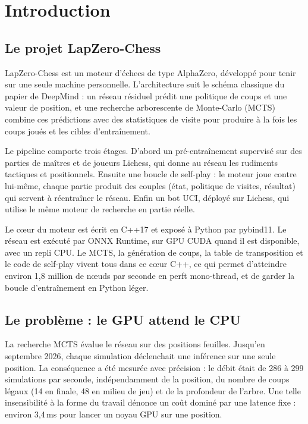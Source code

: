 \section{Introduction}
\label{sec:introduction}

\subsection{Le projet LapZero-Chess}

LapZero-Chess est un moteur d'\'echecs de type AlphaZero, d\'evelopp\'e pour
tenir sur une seule machine personnelle. L'architecture suit le sch\'ema
classique du papier de DeepMind \cite{alpha0316} : un r\'eseau r\'esiduel
pr\'edit une politique de coups et une valeur de position, et une recherche
arborescente de Monte-Carlo (MCTS) combine ces pr\'edictions avec des
statistiques de visite pour produire \`a la fois les coups jou\'es et les
cibles d'entra\^inement.

Le pipeline comporte trois \'etages. D'abord un pr\'e-entra\^inement supervis\'e
sur des parties de ma\^itres et de joueurs Lichess, qui donne au r\'eseau les
rudiments tactiques et positionnels. Ensuite une boucle de self-play : le
moteur joue contre lui-m\^eme, chaque partie produit des couples
(\'etat, politique de visites, r\'esultat) qui servent \`a r\'eentra\^iner le
r\'eseau. Enfin un bot UCI, d\'eploy\'e sur Lichess, qui utilise le m\^eme
moteur de recherche en partie r\'eelle.

Le c\oe{}ur du moteur est \'ecrit en C++17 et expos\'e \`a Python par pybind11.
Le r\'eseau est ex\'ecut\'e par ONNX Runtime, sur GPU CUDA quand il est
disponible, avec un repli CPU. Le MCTS, la g\'en\'eration de coups, la table de
transposition et le code de self-play vivent tous dans ce c\oe{}ur C++, ce qui
permet d'atteindre environ 1,8 million de n\oe{}uds par seconde en perft
mono-thread, et de garder la boucle d'entra\^inement en Python l\'eger.

\subsection{Le probl\`eme : le GPU attend le CPU}

La recherche MCTS \'evalue le r\'eseau sur des positions feuilles. Jusqu'en
septembre 2026, chaque simulation d\'eclenchait une inf\'erence sur une seule
position. La cons\'equence a \'et\'e mesur\'ee avec pr\'ecision : le d\'ebit
\'etait de 286 \`a 299 simulations par seconde, ind\'ependamment de la
position, du nombre de coups l\'egaux (14 en finale, 48 en milieu de jeu) et
de la profondeur de l'arbre. Une telle insensibilit\'e \`a la forme du travail
d\'enonce un co\^ut domin\'e par une latence fixe : environ 3,4\,ms pour lancer
un noyau GPU sur une position.

